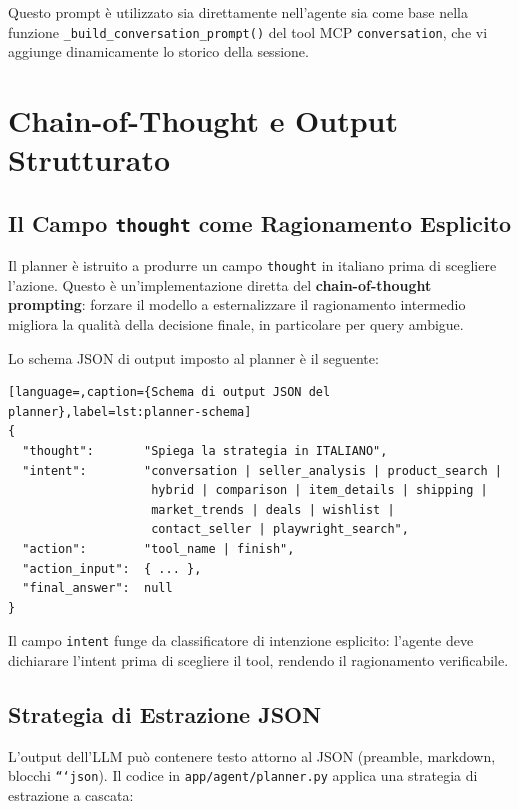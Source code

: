 Questo prompt è utilizzato sia direttamente nell'agente sia come base
nella funzione \texttt{\_build\_conversation\_prompt()} del tool MCP
\texttt{conversation}, che vi aggiunge dinamicamente lo storico della
sessione.


\section{Chain-of-Thought e Output Strutturato}
\label{sec:cot-structured}

\subsection{Il Campo \texttt{thought} come Ragionamento Esplicito}
\label{subsec:thought-field}

Il planner è istruito a produrre un campo \texttt{thought} in italiano
prima di scegliere l'azione. Questo è un'implementazione diretta del
\textbf{chain-of-thought prompting}: forzare il modello a esternalizzare
il ragionamento intermedio migliora la qualità della decisione finale,
in particolare per query ambigue.

Lo schema JSON di output imposto al planner è il seguente:

\begin{lstlisting}[language=,caption={Schema di output JSON del planner},label=lst:planner-schema]
{
  "thought":       "Spiega la strategia in ITALIANO",
  "intent":        "conversation | seller_analysis | product_search |
                    hybrid | comparison | item_details | shipping |
                    market_trends | deals | wishlist |
                    contact_seller | playwright_search",
  "action":        "tool_name | finish",
  "action_input":  { ... },
  "final_answer":  null
}
\end{lstlisting}

Il campo \texttt{intent} funge da classificatore di intenzione esplicito:
l'agente deve dichiarare l'intent prima di scegliere il tool, rendendo
il ragionamento verificabile.

\subsection{Strategia di Estrazione JSON}
\label{subsec:json-extraction}

L'output dell'LLM può contenere testo attorno al JSON (preamble,
markdown, blocchi \texttt{```json}). Il codice in
\texttt{app/agent/planner.py} applica una strategia di estrazione
a cascata:

